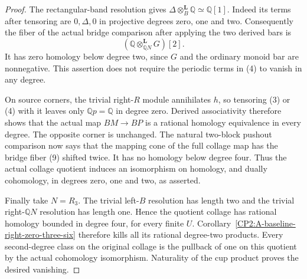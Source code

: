 \begin{proof}
The rectangular-band resolution gives
$\Delta\otimes_B^{\mathbf L}\mathbb Q\simeq\mathbb Q[1]$.
Indeed its terms after tensoring are $0,\Delta,0$
in projective degrees zero, one and two.
Consequently the fiber of the actual bridge comparison
after applying the two derived bars is
\[
 \left(\mathbb Q\otimes_{\mathbb QN}^{\mathbf L}G\right)[2].
                                                               \tag{9}
\]
It has zero homology below degree two, since $G$
and the ordinary monoid bar are nonnegative.
This assertion does not require the periodic terms
in (4) to vanish in any degree.

On source corners, the trivial right-$R$ module
annihilates $h$, so tensoring (3) or (4) with it
leaves only $\mathbb Qp=\mathbb Q$ in degree zero.
Derived associativity therefore shows that the actual
map $BM\to BP$ is a rational homology equivalence
in every degree.  The opposite corner is unchanged.
The natural two-block pushout comparison now says
that the mapping cone of the full collage map has
the bridge fiber (9) shifted twice.
It has no homology below degree four.
Thus the actual collage quotient induces an
isomorphism on homology, and dually cohomology,
in degrees zero, one and two, as asserted.

Finally take $N=R_3$.
The trivial left-$B$ resolution has length two and
the trivial right-$\mathbb QN$ resolution has length one.
Hence the quotient collage has rational homology
bounded in degree four, for every finite $U$.
Corollary~\ref{CP2:A-baseline-right-zero-three-six}
therefore kills all its rational degree-two products.
Every second-degree class on the original collage
is the pullback of one on this quotient by the
actual cohomology isomorphism.  Naturality of the
cup product proves the desired vanishing.
\end{proof}
